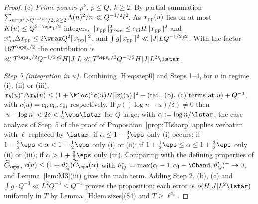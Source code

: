 \begin{proof}
(c) \emph{Prime powers $p^k$, $p\le Q$, $k\ge2$.} By partial summation $\sum_{n=p^k>Q^{1+\eps}/2,\,k\ge2}\Lambda(n)^2/n\ll Q^{-1/2}\ell^2$. As $x_{\rm pp}(u)$ lies on at most $K(u)\le Q^{2-\eps_1/2}$ integers, $\|x_{\rm pp}\|^2_{T^\Wnat}\le c_{\rm iii}H\|x_{\rm pp}\|^2$ and $x_{\rm pp}^*\Delta x_{\rm pp}\le2\wmax Q^2\|x_{\rm pp}\|^2$, and $\int g\|x_{\rm pp}\|^2\ll|J|LQ^{-1/2}\ell^2$. With the factor $16T^{\eps_5/2}$ the contribution is $\ll T^{\eps_5/2}Q^{-1/2}\ell^2H|J|L\ll T^{\eps_5/2}Q^{-1/2}H|J|L^2\lstar$.

\emph{Step 5 (integration in $u$).} Combining \eqref{H:eq:step0} and Steps 1--4, for $u$ in regime (i), (ii) or (iii),
$x_b(u)^*\Delta x_b(u)\le(1+\kloc)^3c(u)H\|x_b^s(u)\|^2+(\text{tail, (b), (c) terms at }u)+Q^{-3}$, with $c(u)=c_{\rm i},c_{\rm ii},c_{\rm iii}$ respectively. If $\rho((\log n-u)/\delta)\ne0$ then $|u-\log n|<2\delta<\frac12\eps\lstar$ for $Q$ large; with $\alpha:=\log n/\lstar$, the case analysis of Step~5 of the proof of Proposition~\ref{prop:TIsharp} applies verbatim with $\ell$ replaced by $\lstar$: if $\alpha\le1-\frac32\eps$ only (i) occurs; if $1-\frac32\eps<\alpha<1+\frac12\eps$ only (i) or (ii); if $1+\frac12\eps\le\alpha\le1+\frac32\eps$ only (ii) or (iii); if $\alpha>1+\frac32\eps$ only (iii). Comparing with the defining properties of $\widetilde C_\eps$, $c(u)\le(1+\vartheta^*_Q)\widetilde C_\eps(\alpha)$ with $\vartheta^*_Q:=\max(c_{\rm i}-1,c_{\rm ii}-\Cband,\vartheta'_Q)^+\to0$, and Lemma~\ref{lem:M3}(iii) gives the main term. Adding Step 2, (b), (c) and $\int g\cdot Q^{-3}\ll L^2Q^{-3}\le Q^{-1}$ proves the proposition; each error is $o(H|J|L^2\lstar)$ uniformly in $T$ by Lemma~\ref{H:lem:sizes}(S4) and $T\ge\ell^{a_0}$.
\end{proof}


